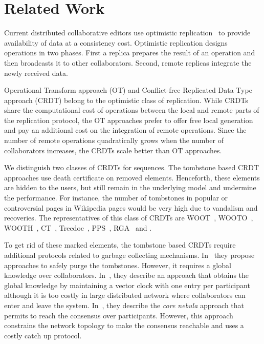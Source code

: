 
\section{Related Work}
\label{sec:relatedwork}
Current distributed collaborative editors use optimistic
replication~\cite{saito2002replication,saito2005optimistic} to provide
availability of data at a consistency cost. Optimistic replication designs
operations in two phases. First a replica prepares the result of an operation
and then broadcasts it to other collaborators. Second, remote replicas
integrate the newly received data.

Operational Transform approach (OT) and Conflict-free Replicated Data Type
approach (CRDT) belong to the optimistic class of replication. While CRDTs
share the computational cost of operations between the local and remote parts
of the replication protocol, the OT approaches prefer to offer free local
generation and pay an additional cost on the integration of remote operations.
Since the number of remote operations quadratically grows when the number of
collaborators increases, the CRDTs scale better than OT approaches.


We distinguish two classes of CRDTs for sequences. The tombstone based CRDT
approaches use death certificate on removed elements. Henceforth, these
elements are hidden to the users, but still remain in the underlying model and
undermine the performance. For instance, the number of tombstones in popular or
controversial pages in Wikipedia pages would be very high due to vandalism and
recoveries. The representatives of this class of CRDTs are
WOOT~\cite{oster2006data}, WOOTO~\cite{weiss2007wooki},
WOOTH~\cite{ahmed2011evaluating}, CT~\cite{grishchenko2010deep},
Treedoc~\cite{preguica2009commutative}, PPS~\cite{wu2010partial},
RGA~\cite{roh2011replicated} and \cite{Yu2012stringwise}.

To get rid of these marked elements, the tombstone based CRDTs require
additional protocols related to garbage collecting
mechanisms. In~\cite{letia2009crdts,roh2011replicated} they propose approaches
to safely purge the tombstones. However, it requires a global knowledge over
collaborators.  In~\cite{roh2011replicated}, they describe an approach that
obtains the global knowledge by maintaining a vector clock with one entry per
participant although it is too costly in large distributed network where
collaborators can enter and leave the system. In~\cite{letia2009crdts}, they
describe the \emph{core nebula} approach that permits to reach the consensus
over participants. However, this approach constrains the network topology to
make the consensus reachable and uses a costly catch up protocol.

